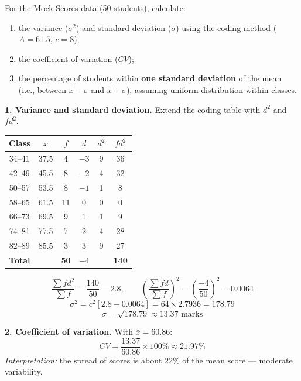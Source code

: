 \documentclass[11pt]{article}
\begin{document}
\begin{exoresolu}
For the Mock Scores data (50 students), calculate:
\begin{enumerate}
    \item the variance ($\sigma^2$) and standard deviation ($\sigma$) using the coding method ($A=61.5$, $c=8$);
    \item the coefficient of variation ($CV$);
    \item the percentage of students within \textbf{one standard deviation} of the mean (i.e., between $\bar{x}-\sigma$ and $\bar{x}+\sigma$), assuming uniform distribution within classes.
\end{enumerate}
\tcblower
\textbf{1. Variance and standard deviation.}
Extend the coding table with $d^2$ and $fd^2$.

\begin{center}
\begin{tabular}{|c|c|c|c|c|c|}\hline
\rowcolor{popblueL}
Class & $x$ & $f$ & $d$ & $d^2$ & $fd^2$ \\ \hline
34--41 & 37.5 & 4 & $-3$ & 9 & 36 \\ \hline
42--49 & 45.5 & 8 & $-2$ & 4 & 32 \\ \hline
50--57 & 53.5 & 8 & $-1$ & 1 & 8 \\ \hline
58--65 & 61.5 & 11 & 0 & 0 & 0 \\ \hline
66--73 & 69.5 & 9 & 1 & 1 & 9 \\ \hline
74--81 & 77.5 & 7 & 2 & 4 & 28 \\ \hline
82--89 & 85.5 & 3 & 3 & 9 & 27 \\ \hline
\textbf{Total} & & \textbf{50} & \textbf{$-4$} & & \textbf{140} \\ \hline
\end{tabular}
\end{center}

\[ \frac{\sum fd^2}{\sum f} = \frac{140}{50} = 2.8, \qquad \left( \frac{\sum fd}{\sum f} \right)^2 = \left( \frac{-4}{50} \right)^2 = 0.0064 \]
\[ \sigma^2 = c^2 \left[ 2.8 - 0.0064 \right] = 64 \times 2.7936 = \mathbf{178.79} \]
\[ \sigma = \sqrt{178.79} \approx \mathbf{13.37} \text{ marks} \]

\textbf{2. Coefficient of variation.}
With $\bar{x} = 60.86$:
\[ CV = \frac{13.37}{60.86} \times 100\% \approx \mathbf{21.97\%} \]
\emph{Interpretation:} the spread of scores is about 22\% of the mean score — moderate variability.


\end{exoresolu}
\end{document}
